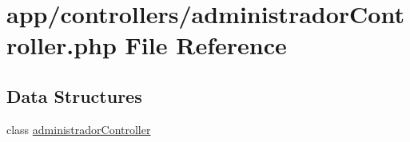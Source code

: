 \hypertarget{administrador_controller_8php}{}\section{app/controllers/administrador\+Controller.php File Reference}
\label{administrador_controller_8php}
\subsection*{Data Structures}
\begin{DoxyCompactItemize}
\item 
class \hyperlink{classadministrador_controller}{administrador\+Controller}
\end{DoxyCompactItemize}
